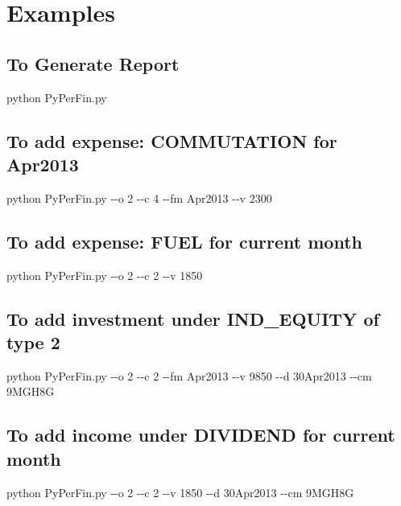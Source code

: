 \documentclass[a4paper,11pt]{book}
\begin{document}
\chapter{Examples}
\section{To Generate Report}
python PyPerFin.py
\section{To add expense: COMMUTATION for Apr2013}
python PyPerFin.py \--\--o 2 \--\--c 4 \--\--fm Apr2013 \--\--v 2300
\section{To add expense: FUEL for current month}
python PyPerFin.py \--\--o 2 \--\--c 2 \--\--v 1850
\section{To add investment under IND\_EQUITY of type 2}
python PyPerFin.py \--\--o 2 \--\--c 2 \--\--fm Apr2013 \--\--v 9850 \--\--d 30Apr2013 \--\--cm 9MGH8G
\section{To add income under DIVIDEND for current month}
python PyPerFin.py \--\--o 2 \--\--c 2 \--\--v 1850 \--\--d 30Apr2013 \--\--cm 9MGH8G
\end{document}
